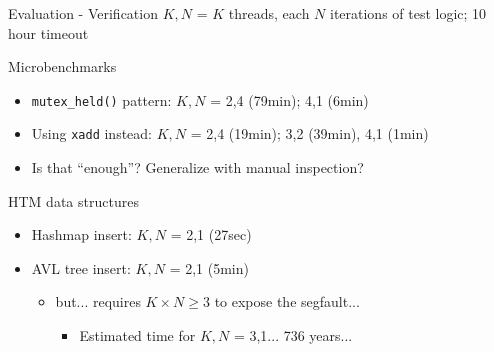 \documentclass[xcolor=dvipsnames]{beamer}
\begin{document}
\begin{frame}{Evaluation - Verification}
	$K,N$ = $K$ threads, each $N$ iterations of test logic; 10 hour timeout
	\linegap

	Microbenchmarks
	\begin{itemize}
		\item {\tt mutex\_held()} pattern: $K,N$ = 2,4 (79min); 4,1 (6min)
		\item Using {\tt xadd} instead: $K,N$ = 2,4 (19min); 3,2 (39min), 4,1 (1min)
		\item Is that ``enough''? Generalize with manual inspection?
	\end{itemize}
	\pause
	\linegap

	HTM data structures
	\begin{itemize}
		\item Hashmap insert: $K,N$ = 2,1 (27sec) %
		\item AVL tree insert: $K,N$ = 2,1 (5min)
			\pause
		\begin{itemize}
			\item but... requires $K \times N \ge 3$ to expose the segfault...
			\begin{itemize}
				\item Estimated time for $K,N$ = 3,1... 736 years...
			\end{itemize}
		\end{itemize}
	\end{itemize}

\end{frame}
\end{document}

